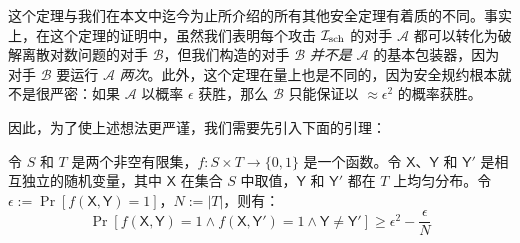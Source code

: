 这个定理与我们在本文中迄今为止所介绍的所有其他安全定理有着质的不同。事实上，在这个定理的证明中，虽然我们表明每个攻击 $\mathcal{I}_{\rm sch}$ 的对手 $\mathcal{A}$ 都可以转化为破解离散对数问题的对手 $\mathcal{B}$，但我们构造的对手 $\mathcal{B}$ \emph{并不是} $\mathcal{A}$ 的基本包装器，因为对手 $\mathcal{B}$ 要运行 $\mathcal{A}$ \emph{两次}。此外，这个定理在量上也是不同的，因为安全规约根本就不是很严密：如果 $\mathcal{A}$ 以概率 $\epsilon$ 获胜，那么 $\mathcal{B}$ 只能保证以 $\approx\epsilon^2$ 的概率获胜。

因此，为了使上述想法更严谨，我们需要先引入下面的引理：

\begin{lemma}[回溯引理]\label{theo:19-2}
	令 $S$ 和 $T$ 是两个非空有限集，$f:S\times T\to\{0,1\}$ 是一个函数。令 $\mathsf{X}$、$\mathsf{Y}$ 和 $\mathsf{Y}'$ 是相互独立的随机变量，其中 $\mathsf{X}$ 在集合 $S$ 中取值，$\mathsf{Y}$ 和 $\mathsf{Y}'$ 都在 $T$ 上均匀分布。令 $\epsilon:=\Pr[f(\mathsf{X},\mathsf{Y})=1]$，$N:=|T|$，则有：
	$$\Pr[f(\mathsf{X},\mathsf{Y})=1\land f(\mathsf{X},\mathsf{Y}')=1\land \mathsf{Y}\neq\mathsf{Y}']\geq\epsilon^2-\frac{\epsilon}{N}$$
\end{lemma}

